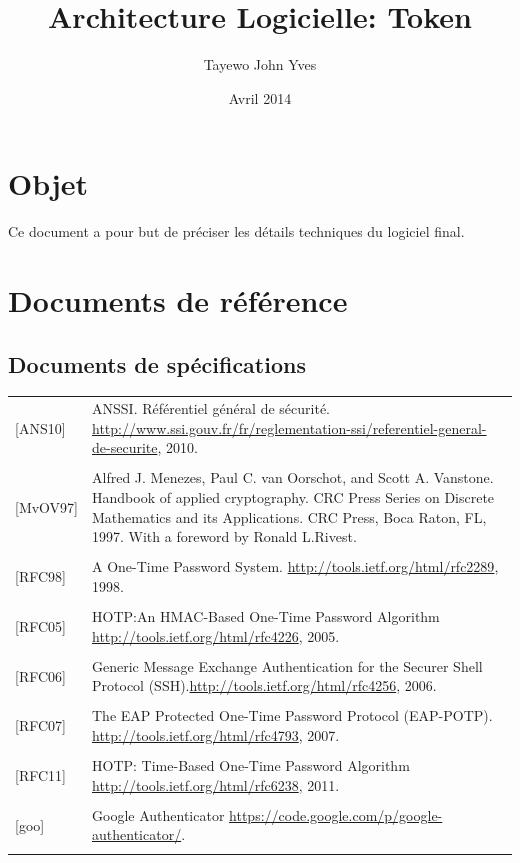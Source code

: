 \documentclass{"../../res/univ-projet"}
\title{Architecture Logicielle: Token}
\author{Tayewo John Yves \bsc{Adegoloye}}
\date{Avril 2014}
\begin{document}
\maketitle
\section{Objet}
Ce document a pour but de préciser les détails techniques du logiciel final.

\section{Documents de référence}
\subsection{Documents de spécifications}
\begin{tabular}{p{}>{\raggedright\arraybackslash}p{13cm}}
    {[ANS10]} & {ANSSI. Référentiel général de sécurité. \href{http://www.ssi.gouv.fr/fr/reglementation-ssi/referentiel-general-de-securite}{http://www.ssi.gouv.fr/fr/reglementation-ssi/referentiel-general-de-securite}, 2010.}
    \tabularnewline
    \\
    {[MvOV97]} & {Alfred J. Menezes, Paul C. van Oorschot, and Scott A. Vanstone. Handbook of applied cryptography. CRC Press Series on Discrete Mathematics and its Applications. CRC Press, Boca Raton, FL, 1997. With a foreword by Ronald L.Rivest.}
    \tabularnewline
    \\
    {[RFC98]} & {A One-Time Password System. \href{http://tools.ietf.org/html/rfc2289}{http://tools.ietf.org/html/rfc2289}, 1998.}
    \tabularnewline
    \\
    {[RFC05]} & {HOTP:An HMAC-Based One-Time Password Algorithm \href{http://tools.ietf.org/html/rfc4226}{http://tools.ietf.org/html/rfc4226}, 2005.}
    \tabularnewline
    \\
    {[RFC06]} & {Generic Message Exchange Authentication for the Securer Shell Protocol (SSH).\href{http://tools.ietf.org/html/rfc4256}{http://tools.ietf.org/html/rfc4256}, 2006.}
    \tabularnewline
    \\
    {[RFC07]} & {The EAP Protected One-Time Password Protocol (EAP-POTP). \href{http://tools.ietf.org/html/rfc4793}{http://tools.ietf.org/html/rfc4793}, 2007.}
    \tabularnewline
    \\
    {[RFC11]} & {HOTP: Time-Based One-Time Password Algorithm \href{http://tools.ietf.org/html/rfc6238}{http://tools.ietf.org/html/rfc6238}, 2011.}
    \tabularnewline
    \\
    {[goo]} & {Google Authenticator \href{https://code.google.com/p/google-authenticator/}{https://code.google.com/p/google-authenticator/}.}
    \tabularnewline
    \\
\end{tabular}
\end{document}
